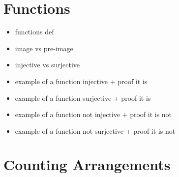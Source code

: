 \documentclass[a4paper,12pt]{article}
\providecommand{\tightlist}{\setlength{\itemsep}{0pt}\setlength{\parskip}{0pt}}
\begin{document}
	
	
	
	
	
	\section{Functions}
	
	\begin{itemize}
	\tightlist
	\item functions def
	\item image vs pre-image
	\item injective vs surjective
	\item example of a function injective + proof it is
	\item example of a function surjective + proof it is
	\item example of a function not injective + proof it is not
	\item example of a function not surjective + proof it is not
	\end{itemize}
	
	
	
	
	
	\section{Counting Arrangements}
	
	
\end{document}

